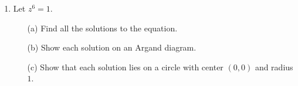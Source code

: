 \documentclass{sbs-exam}
\begin{document}
\begin{enumerate}

\item 
Let $ z^6 = 1$.  
\begin{enumerate}
\item[(a)] Find all the solutions to the equation.

\vspace{8cm} %

\item[(b)] Show each solution on an Argand diagram.

\vspace{4cm} %

\item[(c)] Show that each solution lies on a circle with center $(0, 0)$ and radius $1$.

\vspace{4cm} %

\end{enumerate}

\end{enumerate}
\end{document}

